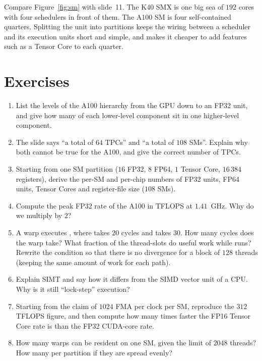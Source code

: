 \begin{intuition}
Compare Figure~\ref{fig:sm} with slide~11. The K40 SMX is one big sea of $192$ cores with four schedulers in front of them.
The A100 SM is four self-contained quarters. Splitting the unit into partitions keeps the wiring between a scheduler and its execution units short
and simple, and makes it cheaper to add features such as a Tensor Core to each quarter.
\end{intuition}

\section*{Exercises}
\begin{enumerate}[label=\textbf{\thechapter.\arabic*},leftmargin=*]
  \item List the levels of the A100 hierarchy from the GPU down to an FP32 unit, and give how many of each lower-level component sit in one higher-level component.
  \item The slide says ``a total of $64$ TPCs'' and ``a total of $108$ SMs''. Explain why both cannot be true for the A100, and give the correct number of TPCs.
  \item Starting from one SM partition ($16$ FP32, $8$ FP64, $1$ Tensor Core, $16\,384$ registers), derive the per-SM and per-chip numbers of FP32 units, FP64 units, Tensor Cores and register-file size ($108$ SMs).
  \item Compute the peak FP32 rate of the A100 in TFLOPS at $1.41$~GHz. Why do we multiply by $2$?
  \item A warp executes , where  takes $20$ cycles and  takes $30$. How many cycles does the warp take? What fraction of the thread-slots do useful work while  runs? Rewrite the condition so that there is no divergence for a block of $128$ threads (keeping the same amount of work for each path).
  \item Explain SIMT and say how it differs from the SIMD vector unit of a CPU. Why is it still ``lock-step'' execution?
  \item Starting from the claim of $1024$ FMA per clock per SM, reproduce the $312$ TFLOPS figure, and then compute how many times faster the FP16 Tensor Core rate is than the FP32 CUDA-core rate.
  \item How many warps can be resident on one SM, given the limit of $2048$ threads? How many per partition if they are spread evenly?
\end{enumerate}
